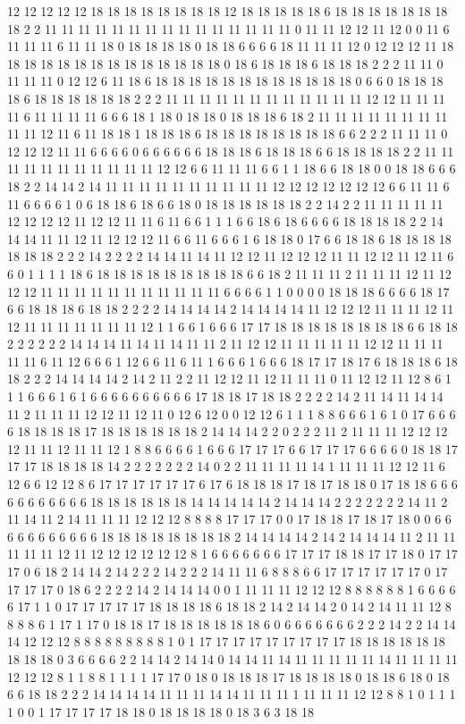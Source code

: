 12 12 12 12 12 18 18 18 18 18 18 18 18 12 18 18 18 18 18 6 18 18 18 18 18 18 18 18 2 2 11 11 11 11 11 11 11 11 11 11 11 11 11 11 11 0 11 11 12 12 11 12 0 0 11 6 11 11 11 6 11 11 18 0 18 18 18 18 0 18 18 6 6 6 6 18 11 11 11 12 0 12 12 12 11 18 18 18 18 18 18 18 18 18 18 18 18 18 18 0 18 6 18 18 18 6 18 18 18 2 2 2 11 11 0 11 11 11 0 12 12 6 11 18 6 18 18 18 18 18 18 18 18 18 18 18 18 0 6 6 0 18 18 18 18 6 18 18 18 18 18 18 2 2 2 11 11 11 11 11 11 11 11 11 11 11 11 12 12 11 11 11 11 6 11 11 11 11 6 6 6 18 1 18 0 18 18 0 18 18 18 6 18 2 11 11 11 11 11 11 11 11 11 11 12 11 6 11 18 18 1 18 18 18 6 18 18 18 18 18 18 18 18 6 6 2 2 2 11 11 11 0 12 12 12 11 11 6 6 6 6 0 6 6 6 6 6 6 18 18 18 6 18 18 18 6 6 18 18 18 18 2 2 11 11 11 11 11 11 11 11 11 11 11 12 12 6 6 11 11 11 6 6 1 1 18 6 6 18 18 0 0 18 18 6 6 6 18 2 2 14 14 2 14 11 11 11 11 11 11 11 11 11 11 12 12 12 12 12 12 12 6 6 11 11 6 11 6 6 6 6 1 0 6 18 18 6 18 6 6 18 0 18 18 18 18 18 18 2 2 14 2 2 11 11 11 11 11 12 12 12 12 11 12 12 11 11 6 11 6 6 1 1 1 6 6 18 6 18 6 6 6 6 18 18 18 18 2 2 14 14 14 11 11 12 11 12 12 12 11 6 6 11 6 6 6 1 6 18 18 0 17 6 6 18 18 6 18 18 18 18 18 18 18 2 2 2 14 2 2 2 2 14 14 11 14 11 12 12 11 12 12 12 11 11 12 12 11 12 11 6 6 0 1 1 1 1 18 6 18 18 18 18 18 18 18 18 18 6 6 18 2 11 11 11 2 11 11 11 12 11 12 12 12 11 11 11 11 11 11 11 11 11 11 11 6 6 6 6 1 1 0 0 0 0 18 18 18 6 6 6 6 18 17 6 6 18 18 18 6 18 18 2 2 2 2 14 14 14 14 2 14 14 14 14 11 12 12 12 11 11 11 12 11 12 11 11 11 11 11 11 11 12 1 1 6 6 1 6 6 6 17 17 18 18 18 18 18 18 18 18 6 6 18 18 2 2 2 2 2 2 14 14 14 11 14 11 14 11 11 2 11 12 12 11 11 11 11 11 12 12 11 11 11 11 11 6 11 12 6 6 6 1 12 6 6 11 6 11 1 6 6 6 1 6 6 6 18 17 17 18 17 6 18 18 18 6 18 18 2 2 2 14 14 14 14 2 14 2 11 2 2 11 12 12 11 12 11 11 11 0 11 12 12 11 12 8 6 1 1 1 6 6 6 1 6 1 6 6 6 6 6 6 6 6 6 6 17 18 18 17 18 18 2 2 2 2 14 2 11 14 11 14 14 11 2 11 11 11 12 12 11 12 11 0 12 6 12 0 0 12 12 6 1 1 1 8 8 6 6 6 1 6 1 0 17 6 6 6 6 18 18 18 18 17 18 18 18 18 18 18 2 14 14 14 2 2 0 2 2 2 11 2 11 11 11 12 12 12 12 11 11 12 11 11 12 1 8 8 6 6 6 6 1 6 6 6 17 17 17 6 6 17 17 17 6 6 6 6 0 18 18 17 17 17 18 18 18 18 14 2 2 2 2 2 2 2 14 0 2 2 11 11 11 11 14 1 11 11 11 12 12 11 6 12 6 6 12 12 8 6 17 17 17 17 17 17 6 17 6 18 18 18 17 18 17 18 18 0 17 18 18 6 6 6 6 6 6 6 6 6 6 6 18 18 18 18 18 18 14 14 14 14 14 2 14 14 14 2 2 2 2 2 2 2 14 11 2 11 14 11 2 14 11 11 11 12 12 12 8 8 8 8 17 17 17 0 0 17 18 18 17 18 17 18 0 0 6 6 6 6 6 6 6 6 6 6 6 18 18 18 18 18 18 18 18 2 14 14 14 14 2 14 2 14 14 14 11 2 11 11 11 11 11 12 11 12 12 12 12 12 12 8 1 6 6 6 6 6 6 6 17 17 17 18 18 17 17 18 0 17 17 17 0 6 18 2 14 14 2 14 2 2 2 14 2 2 2 14 11 11 6 8 8 8 6 6 17 17 17 17 17 17 0 17 17 17 17 0 18 6 2 2 2 2 14 2 14 14 14 0 0 1 11 11 11 12 12 12 8 8 8 8 8 8 1 6 6 6 6 6 17 1 1 0 17 17 17 17 17 18 18 18 18 6 18 18 2 14 2 14 14 2 0 14 2 14 11 11 12 8 8 8 8 6 1 17 1 17 0 18 18 17 18 18 18 18 18 18 6 0 6 6 6 6 6 6 6 2 2 2 14 2 2 14 14 14 12 12 12 8 8 8 8 8 8 8 8 8 1 0 1 17 17 17 17 17 17 17 17 17 18 18 18 18 18 18 18 18 18 0 3 6 6 6 6 2 2 14 14 2 14 14 0 14 14 11 14 11 11 11 11 11 14 11 11 11 11 12 12 12 8 1 1 8 8 1 1 1 1 17 17 0 18 0 18 18 18 17 18 18 18 18 0 18 18 6 18 0 18 6 6 18 18 2 2 2 14 14 14 14 11 11 11 14 14 11 11 11 1 11 11 11 12 12 8 8 1 0 1 1 1 1 0 0 1 17 17 17 17 18 18 0 18 18 18 18 0 18 3 6 3 18 18 